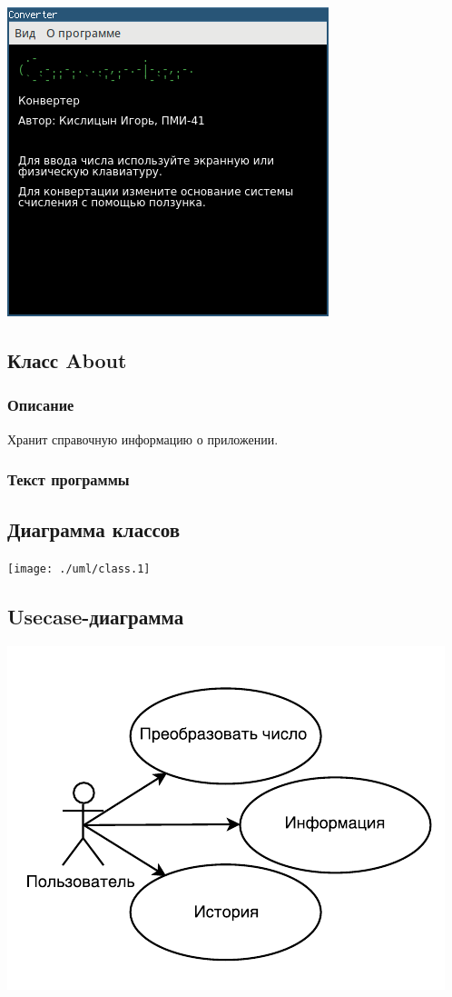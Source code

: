 \documentclass[oneside, final, 10pt]{extarticle}
\begin{document}
\includegraphics{./screen/test_iface3}

\subsection{Класс About}

\subsubsection{Описание}

Хранит справочную информацию о приложении.

\subsubsection{Текст программы}

\lstset{caption=about.js}


\subsection{Диаграмма классов}
\texttt{[image: ./uml/class.1]}

\subsection{Usecase-диаграмма}
\includegraphics{./uml/usecase}
\end{document}
